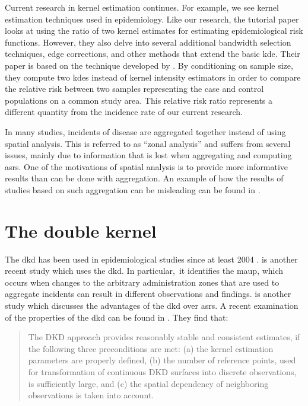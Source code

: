 Current research in kernel estimation continues.
For example, we see kernel estimation techniques used in epidemiology.
Like our research,
the tutorial paper \citet{davies2018tutorial} looks at using the ratio of two kernel estimates for estimating epidemiological risk functions.
However,
they also delve into several additional bandwidth selection techniques,
edge corrections,
and other methods that extend the basic \gls{kde}.
Their paper is based on the technique developed by \citet{bithell1990application,bithell1991estimation,kelsall1995kernel}.
By conditioning on sample size,
they compute two \glspl{kde} instead of \glspl{kernel intensity estimator} in order to compare the relative risk between two samples representing the case and control populations on a common study area.
This relative risk ratio represents a different quantity from the incidence rate of our current research.

In many studies,
incidents of disease are aggregated together instead of using spatial analysis.
This is referred to as ``zonal analysis'' and suffers from several issues,
mainly due to information that is lost when aggregating and computing \glspl{asr}.
One of the motivations of spatial analysis is to provide more informative results than can be done with aggregation.
An example of how the results of studies based on such aggregation can be misleading can be found in \citet{portnov2007ecological}.

\section{The double kernel}

The \acrfull{dkd} has been used in epidemiological studies since at least 2004 \citep{rushton2004analyzing}.
\citet{kloog2009using} is another recent study which uses the \gls{dkd}.
In particular,\
it identifies the \gls{maup},
which occurs when changes to the arbitrary administration zones that are used to aggregate incidents can result in different observations and findings.
\citet{zusman2012residential} is another study which discusses the advantages of the \gls{dkd} over \glspl{asr}.
A recent examination of the properties of the \gls{dkd} can be found in \citet{zusman2016application}.
They find that:
\begin{quotation}
The DKD approach provides reasonably stable and consistent estimates, if the following three preconditions are met: (a) the kernel estimation parameters are properly defined, (b) the number of reference points, used for transformation of continuous DKD surfaces into discrete observations, is sufficiently large, and (c) the spatial dependency of neighboring observations is taken into account.
\end{quotation}

